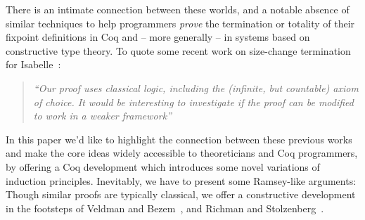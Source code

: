 \documentclass{llncs}
\begin{document}
There is an intimate connection between these worlds, and a notable absence of similar techniques
to help programmers {\em prove} the termination or totality of their fixpoint definitions in Coq and -- more 
generally -- in systems based on constructive type theory. To quote some recent work on size-change termination
for Isabelle~\cite{Krauss07}:
\begin{quote}
{\em ``Our proof uses classical logic, including the (infinite, but countable) axiom of choice. It would be interesting to investigate if the proof can be modified to work in a weaker framework''}
\end{quote}

In this paper we'd like to highlight the connection between these previous works and make the core ideas widely 
accessible to theoreticians and Coq programmers, by offering 
a Coq development which introduces some novel variations of induction principles. Inevitably, we have 
to present some Ramsey-like arguments: Though similar proofs are typically classical, we offer a 
constructive development in the footsteps of Veldman and Bezem~\cite{Veldman01041993,coquand-short},
and Richman and Stolzenberg~\cite{wqo-sets}.
\end{document}
